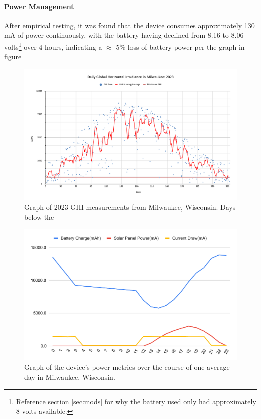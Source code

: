 \documentclass[fleqn,10pt]{SelfArx} %
\begin{document}
	\paragraph*{Power Management}
	After empirical testing, it was found that the device consumes approximately 130 mA of power continuously, with the battery having declined from 8.16 to 8.06 volts\footnote{Reference section \ref{sec:mods} for why the battery used only had approximately 8 volts available.} over 4 hours, indicating a $\approx$ 5\% loss of battery power per the graph in figure 
	
	\begin{figure}[h]
		\centering
		\includegraphics[width=1\linewidth]{Figures/MKE_GHI}
		\caption[Daily GHI in Milwaukee]{Graph of 2023 GHI measurements from Milwaukee, Wisconsin. Days below the }
		\label{fig:GHI}
	\end{figure} 
	
	\begin{figure}[h]
		\centering
		\includegraphics[width=1\linewidth]{Figures/MedDay}
		\caption[Power Consumption Graph]{Graph of the device's power metrics over the course of one average day in Milwaukee, Wisconsin.}
		\label{fig:ElecMod}
	\end{figure} 
	
\end{document}
